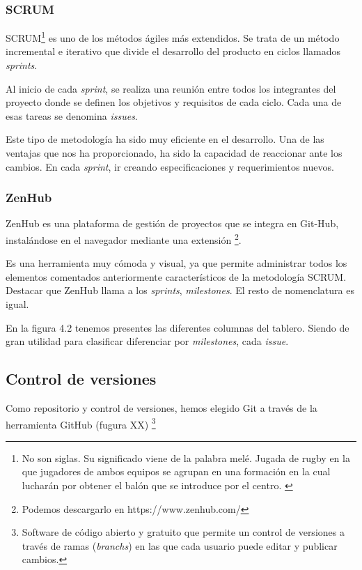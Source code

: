 \subsubsection{SCRUM}

SCRUM\footnote{No son siglas. Su significado viene de la palabra melé. Jugada de rugby en la que 
	jugadores de ambos equipos se agrupan en una formación en la cual lucharán por obtener el balón que se introduce por el centro. \cite{web:scrum_origen}} es uno de los métodos ágiles más extendidos. Se trata de un método incremental e iterativo que divide el desarrollo del producto en ciclos llamados \textit{sprints}.

Al inicio de cada \textit{sprint}, se realiza una reunión entre todos los integrantes del proyecto donde se definen los objetivos y requisitos de cada ciclo. Cada una de esas tareas se denomina \textit{issues}.

Este tipo de metodología ha sido muy eficiente en el desarrollo. Una de las ventajas que nos ha proporcionado, ha sido la capacidad de reaccionar ante los cambios. En cada \textit{sprint}, ir creando especificaciones y requerimientos nuevos.

\subsubsection{ZenHub}

ZenHub es una plataforma de gestión de proyectos que se integra en Git-Hub, instalándose en el navegador mediante una extensión \footnote{Podemos descargarlo en https://www.zenhub.com/}.

Es una herramienta muy cómoda y visual, ya que permite administrar todos los elementos comentados anteriormente característicos de la metodología SCRUM. Destacar que ZenHub llama a los \textit{sprints}, \textit{milestones}. El resto de nomenclatura es igual.

En la figura 4.2 tenemos presentes las diferentes columnas del tablero. Siendo de gran utilidad para clasificar diferenciar por \textit{milestones}, cada \textit{issue}.


\subsection{Control de versiones}

Como repositorio y control de versiones, hemos elegido Git a través de la herramienta GitHub (fugura XX) \footnote{Software de código abierto y gratuito que permite un control de versiones a través de ramas (\textit{branchs}) en las que cada usuario puede editar y publicar cambios.}

